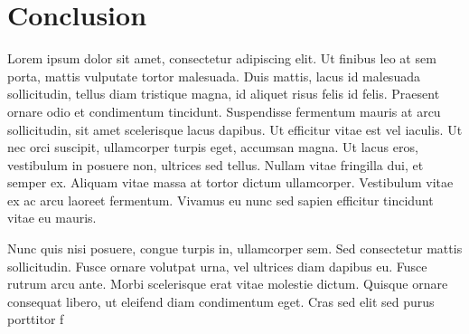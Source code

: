 \section{Conclusion}
Lorem ipsum dolor sit amet, consectetur adipiscing elit. Ut finibus leo at sem porta, mattis vulputate tortor malesuada. Duis mattis, lacus id malesuada sollicitudin, tellus diam tristique magna, id aliquet risus felis id felis. Praesent ornare odio et condimentum tincidunt. Suspendisse fermentum mauris at arcu sollicitudin, sit amet scelerisque lacus dapibus. Ut efficitur vitae est vel iaculis. Ut nec orci suscipit, ullamcorper turpis eget, accumsan magna. Ut lacus eros, vestibulum in posuere non, ultrices sed tellus. Nullam vitae fringilla dui, et semper ex. Aliquam vitae massa at tortor dictum ullamcorper. Vestibulum vitae ex ac arcu laoreet fermentum. Vivamus eu nunc sed sapien efficitur tincidunt vitae eu mauris.

Nunc quis nisi posuere, congue turpis in, ullamcorper sem. Sed consectetur mattis sollicitudin. Fusce ornare volutpat urna, vel ultrices diam dapibus eu. Fusce rutrum arcu ante. Morbi scelerisque erat vitae molestie dictum. Quisque ornare consequat libero, ut eleifend diam condimentum eget. Cras sed elit sed purus porttitor f
